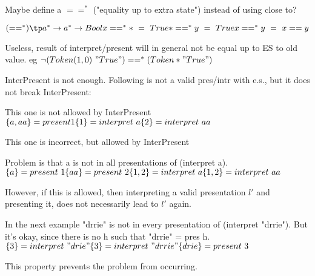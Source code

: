 
Maybe define a $==^*$ ("equality up to extra state") instead of using close to?

\begin{math}
(==^*) \tp a^* \rightarrow a^* \rightarrow Bool\\
x ==^* * ~=~ True\\
* ==^* y ~=~ True\\
x ==^* y ~=~ x == y\\
\end{math}

Useless, result of interpret/present will in general not be equal up to ES to old value. eg $\lnot (Token (1,0)~"True") ==^* (Token * "True")$


{\sc InterPresent}  is not enough. Following is not a valid pres/intr with e.s., but it does not break {\sc InterPresent}:

This one is not allowed by {\sc InterPresent}
\begin{math}
\{a,aa\} = present 1\\
\{1\} = interpret~a\\
\{2\} = interpret~aa
\end{math}

This one is incorrect, but allowed by  {\sc InterPresent}

Problem is that a is not in all presentations of (interpret a). 
\begin{math}
\{a\} = present~1\\
\{aa\} = present~2\\
\{1,2\} = interpret~a\\
\{1,2\} = interpret~aa\\
\end{math}

However, if this is allowed, then interpreting a valid presentation $l'$ and presenting it, does not necessarily lead to $l'$ again. 


In the next example "drrie" is not in every presentation of (interpret  "drrie"). But it's okay, since there is no h such that "drrie" = pres h.
\begin{math}
\{3\} = interpret~"drie"\\
\{3\} = interpret~"drrie"\\
\{drie\} = present~3
\end{math}

This property prevents the problem from occurring.

